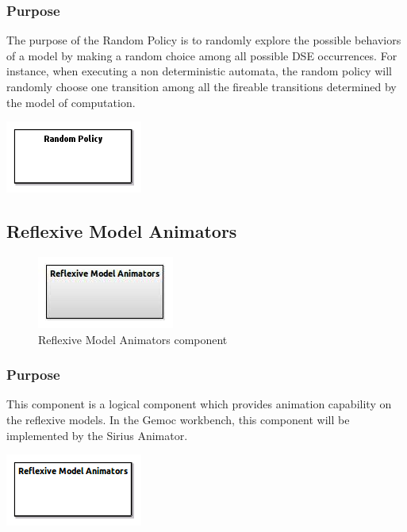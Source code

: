 \documentclass{gemoc} %
\begin{document}
\subsubsection{Purpose}
The purpose of the Random Policy is to randomly explore the possible behaviors of a model by making a random choice among all possible DSE occurrences. For instance, when executing a non deterministic automata, the random policy will randomly choose one transition among all the fireable transitions determined by the model of computation.
\begin{center}
\includegraphics*[trim=0.0cm 0.0cm 0cm 0.0cm, clip=true]{../images/generated/Generated_Random_Policy.png}
\end{center}



\subsection{Reflexive Model Animators}

\begin{figure}[htp]
	\begin{center}
	\includegraphics*[trim=0.0cm 0.0cm 0cm 0.0cm, clip=true, scale=1.0]{../images/generated/Generated_Reflexive Model Animators.jpg}
	\caption{Reflexive Model Animators component}
	\end{center}
\end{figure}

\subsubsection{Purpose}
This component is a logical component which provides animation capability on the reflexive models. In the Gemoc workbench, this component will be implemented by the Sirius Animator.
\begin{center}
\includegraphics*[trim=0.0cm 0.0cm 0cm 0.0cm, clip=true]{../images/generated/Generated_Reflexive_Model_Animators.png}
\end{center}
\end{document}
